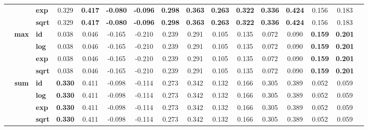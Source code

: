 \begin{table}[t!]
{\begin{tabular}{cclccccccccccccc}
                & & \textbf{exp}  & 0.329 & \textbf{0.417} & \textbf{-0.080} & \textbf{-0.096} & \textbf{0.298} & \textbf{0.363} & \textbf{0.263} & \textbf{0.322} & \textbf{0.336} & \textbf{0.424} & 0.156 & 0.183 \\
                & & \textbf{sqrt} & 0.329 & \textbf{0.417} & \textbf{-0.080} & \textbf{-0.096} & \textbf{0.298} & \textbf{0.363} & \textbf{0.263} & \textbf{0.322} & \textbf{0.336} & \textbf{0.424} & 0.156 & 0.183 \\
        \cmidrule{2-15}
        & \multirow{4}{*}{\textbf{max}}
                  & \textbf{id}   & 0.038 & 0.046 & -0.165 & -0.210 & 0.239 & 0.291 & 0.105 & 0.135 & 0.072 & 0.090 & \textbf{0.159} & \textbf{0.201} \\
                & & \textbf{log}  & 0.038 & 0.046 & -0.165 & -0.210 & 0.239 & 0.291 & 0.105 & 0.135 & 0.072 & 0.090 & \textbf{0.159} & \textbf{0.201} \\
                & & \textbf{exp}  & 0.038 & 0.046 & -0.165 & -0.210 & 0.239 & 0.291 & 0.105 & 0.135 & 0.072 & 0.090 & \textbf{0.159} & \textbf{0.201} \\
                & & \textbf{sqrt} & 0.038 & 0.046 & -0.165 & -0.210 & 0.239 & 0.291 & 0.105 & 0.135 & 0.072 & 0.090 & \textbf{0.159} & \textbf{0.201} \\
        \cmidrule{2-15}
        & \multirow{4}{*}{\textbf{sum}}
                  & \textbf{id}   & \textbf{0.330} & 0.411 & -0.098 & -0.114 & 0.273 & 0.342 & 0.132 & 0.166 & 0.305 & 0.389 & 0.052 & 0.059 \\
                & & \textbf{log}  & \textbf{0.330} & 0.411 & -0.098 & -0.114 & 0.273 & 0.342 & 0.132 & 0.166 & 0.305 & 0.389 & 0.052 & 0.059 \\
                & & \textbf{exp}  & \textbf{0.330} & 0.411 & -0.098 & -0.114 & 0.273 & 0.342 & 0.132 & 0.166 & 0.305 & 0.389 & 0.052 & 0.059 \\
                & & \textbf{sqrt} & \textbf{0.330} & 0.411 & -0.098 & -0.114 & 0.273 & 0.342 & 0.132 & 0.166 & 0.305 & 0.389 & 0.052 & 0.059 \\
        \midrule


\end{tabular}}
\end{table}
